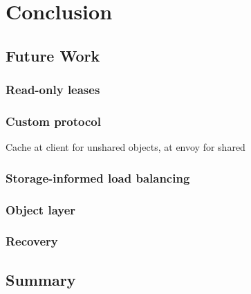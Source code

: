 \chapter{Conclusion}\label{cha:conclusion}

\section{Future Work}
\subsection{Read-only leases}
\subsection{Custom protocol}
Cache at client for unshared objects, at envoy for shared
\subsection{Storage-informed load balancing}
\subsection{Object layer}
\subsection{Recovery}

\section{Summary}
